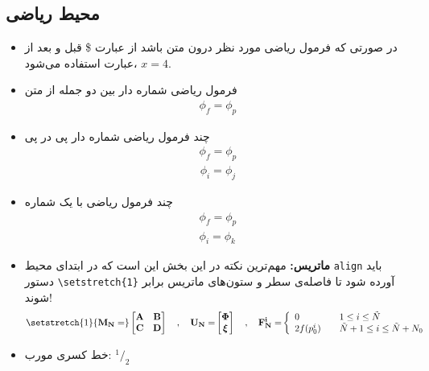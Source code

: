 \subsection{محیط ریاضی}
\begin{itemize}
\item
در صورتی که فرمول ریاضی مورد نظر درون متن باشد از عبارت \$ قبل و بعد از عبارت استفاده می‌شود، 
$x=4$.
\item 
فرمول ریاضی شماره دار بین دو جمله از متن
\begin{align}\label{Eq: equation1}
\phi _f = \phi _p
\end{align} 
\item
چند فرمول ریاضی شماره دار پی در پی
\begin{align}\label{Eq: equation2}
\phi _f = \phi _p
\end{align}
\begin{align}\label{Eq: equation3}
\phi _i = \phi _j
\end{align} 
\item
چند فرمول ریاضی با یک شماره
\begin{equation} \label{Eq: equation4}
\begin{split}
& \phi _f = \phi _p &\\
& \phi _i = \phi _k &
\end{split}
\end{equation}
\item
\textbf{ماتریس:} مهم‌ترین نکته در این بخش این است که در ابتدای محیط 
\verb!align!
باید دستور
\verb!\setstretch{1}!
 آورده شود تا فاصله‌ی سطر و ستون‌های ماتریس برابر شوند!
\begin{align}
\setstretch{1}
{\bf M_N=}
\begin{bmatrix}
{\bf A} & {\bf B}\\
{\bf C} & {\bf D}
\end{bmatrix}
\quad , \quad {\bf U_N=}
\begin{bmatrix}
\boldsymbol{\Phi}\\
{\boldsymbol{\xi}}
\end{bmatrix}
\quad , \quad {\bf F_N ^i=} \left \{
\begin{array}{lll}
0 & & 1 \leq i \leq \tilde{N}\\
2f(p_0 ^i) & & \tilde{N} + 1 \leq i \leq \tilde{N} + N_0\\
\end{array}\right. \nonumber
\end{align}
\item
خط کسری مورب:
${}^1/_2$
\end{itemize}
